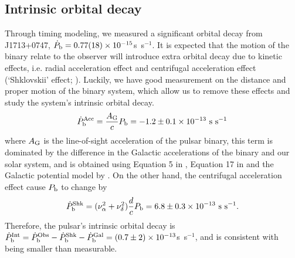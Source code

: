 \subsection{Intrinsic orbital decay}
\label{sec:obdecay}
Through timing modeling, we measured a significant orbital decay from
J1713+0747, $\dot{P}_{\rm b} = 0.77(18)\times10^{-15}$s~s$^{-1}$. 
It is expected that the motion of the binary relate to the observer will introduce extra orbital decay due to kinetic effects, i.e. radial acceleration effect \citep{dt91} and centrifugal acceleration effect (`Shklovskii' effect; \citealt{shk70}). Luckily, we have good measurement on the distance and proper motion of the binary system, which allow us to remove these effects 
and study the system's intrinsic orbital decay.
\begin{equation}
\dot{P}_{\rm b}^{\rm Acc} = \frac{A_{\rm G}}{c} P_{\rm b} =
-1.2\pm0.1\times10^{-13}~{\rm s~s^{-1}}
\end{equation}
where $A_{\rm G}$ is the line-of-sight acceleration of the pulsar binary,
this term is dominated by the difference in the Galactic accelerations of the
binary and our solar system, and is obtained using
Equation 5 in \citet{nt95}, Equation 17 in \citet{lwj+09} and the Galactic
potential model by \citet{hf04a}.
On the other hand, the centrifugal acceleration effect cause $P_{\rm b}$ to
change by
\begin{equation}
\dot{P}_{\rm b}^{\rm Shk} = (\nu_{\alpha}^2+\nu_{\delta}^2)\frac{d}{c}P_{\rm
b} = 6.8\pm0.3\times10^{-13}~{\rm s~s^{-1}}.
\end{equation}
Therefore, the pulsar's intrinsic orbital decay is $\dot{P}_{\rm b}^{\rm Int}
= \dot{P}_{\rm b}^{\rm Obs} - \dot{P}_{\rm b}^{\rm Shk} - \dot{P}_{\rm b}^{\rm
Gal} = (0.7\pm2)\times10^{-13}$s~s$^{-1}$, and is consistent with being smaller than measurable.

